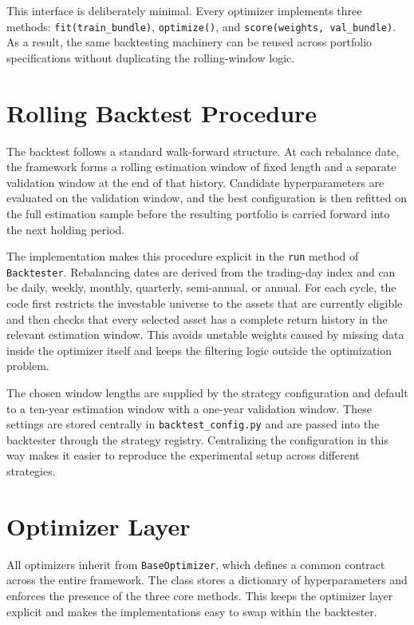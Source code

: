 This interface is deliberately minimal. Every optimizer implements three methods: \texttt{fit(train\_bundle)}, \texttt{optimize()}, and \texttt{score(weights, val\_bundle)}. As a result, the same backtesting machinery can be reused across portfolio specifications without duplicating the rolling-window logic.

\section{Rolling Backtest Procedure}

The backtest follows a standard walk-forward structure. At each rebalance date, the framework forms a rolling estimation window of fixed length and a separate validation window at the end of that history. Candidate hyperparameters are evaluated on the validation window, and the best configuration is then refitted on the full estimation sample before the resulting portfolio is carried forward into the next holding period.

The implementation makes this procedure explicit in the \texttt{run} method of \texttt{Backtester}. Rebalancing dates are derived from the trading-day index and can be daily, weekly, monthly, quarterly, semi-annual, or annual. For each cycle, the code first restricts the investable universe to the assets that are currently eligible and then checks that every selected asset has a complete return history in the relevant estimation window. This avoids unstable weights caused by missing data inside the optimizer itself and keeps the filtering logic outside the optimization problem.

The chosen window lengths are supplied by the strategy configuration and default to a ten-year estimation window with a one-year validation window. These settings are stored centrally in \texttt{backtest\_config.py} and are passed into the backtester through the strategy registry. Centralizing the configuration in this way makes it easier to reproduce the experimental setup across different strategies.

\section{Optimizer Layer}

All optimizers inherit from \texttt{BaseOptimizer}, which defines a common contract across the entire framework. The class stores a dictionary of hyperparameters and enforces the presence of the three core methods. This keeps the optimizer layer explicit and makes the implementations easy to swap within the backtester.

